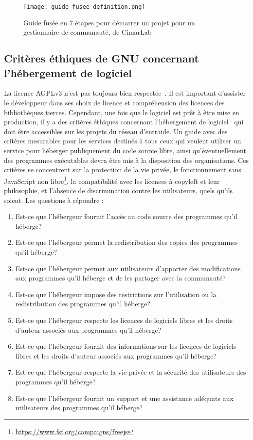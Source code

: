 \begin{figure}[htb]
\centering
\texttt{[image: guide\_fusee\_definition.png]}
\caption{Guide fusée en 7 étapes pour démarrer un projet pour un gestionnaire de communauté, de CimarLab~\cite{guide_fusee}}
\label{fig:guide_fusee}
\end{figure}

\subsection{Critères éthiques de GNU concernant l'hébergement de logiciel}

La licence AGPLv3 n’est pas toujours bien respectée~\cite{violation_libre_2017}. Il est important d'assister le développeur dans ses choix de licence et compréhension des licences des bibliothèques tierces. Cependant, une fois que le logiciel est prêt à être mise en production, il y a des critères éthiques concernant l'hébergement de logiciel~\cite{gnu_critere_hebergement_2022} qui doit être accessibles sur les projets du réseau d’entraide. Un guide avec des critères mesurables pour les services destinés à tous ceux qui veulent utiliser un service pour héberger publiquement du code source libre, ainsi qu'éventuellement des programmes exécutables devra être mis à la disposition des organisations. Ces critères se concentrent sur la protection de la vie privée, le fonctionnement sans JavaScript non libre\footnote{\url{https://www.fsf.org/campaigns/freejs}}, la compatibilité avec les licences à copyleft et leur philosophie, et l'absence de discrimination contre les utilisateurs, quels qu'ils soient.  Les questions à répondre : 

\begin{enumerate}
    \item Est-ce que l'hébergeur fournit l'accès au code source des programmes qu'il héberge?
    \item Est-ce que l'hébergeur permet la redistribution des copies des programmes qu'il héberge?
    \item Est-ce que l'hébergeur permet aux utilisateurs d'apporter des modifications aux programmes qu'il héberge et de les partager avec la communauté?
    \item Est-ce que l'hébergeur impose des restrictions sur l'utilisation ou la redistribution des programmes qu'il héberge?
    \item Est-ce que l'hébergeur respecte les licences de logiciels libres et les droits d'auteur associés aux programmes qu'il héberge?
    \item Est-ce que l'hébergeur fournit des informations sur les licences de logiciels libres et les droits d'auteur associés aux programmes qu'il héberge?
    \item Est-ce que l'hébergeur respecte la vie privée et la sécurité des utilisateurs des programmes qu'il héberge?
    \item Est-ce que l'hébergeur fournit un support et une assistance adéquats aux utilisateurs des programmes qu'il héberge?
\end{enumerate}


